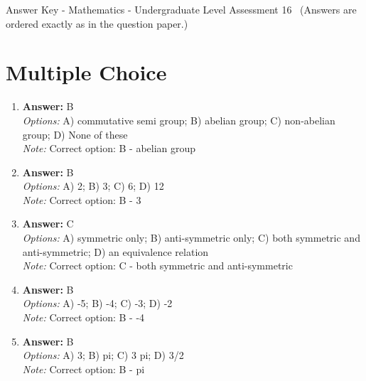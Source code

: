 \documentclass[12pt]{article}
\begin{document}
\begin{center}
Answer Key - Mathematics - Undergraduate Level Assessment 16 \
\small (Answers are ordered exactly as in the question paper.)
\end{center}

\section*{Multiple Choice}
\begin{enumerate}[label=\arabic*.]
\item \textbf{Answer:} B
\\ \textit{Options:} A) commutative semi group; B) abelian group; C) non-abelian group; D) None of these
\\ \textit{Note:} Correct option: B - abelian group
\item \textbf{Answer:} B
\\ \textit{Options:} A) 2; B) 3; C) 6; D) 12
\\ \textit{Note:} Correct option: B - 3
\item \textbf{Answer:} C
\\ \textit{Options:} A) symmetric only; B) anti-symmetric only; C) both symmetric and anti-symmetric; D) an equivalence relation
\\ \textit{Note:} Correct option: C - both symmetric and anti-symmetric
\item \textbf{Answer:} B
\\ \textit{Options:} A) -5; B) -4; C) -3; D) -2
\\ \textit{Note:} Correct option: B - -4
\item \textbf{Answer:} B
\\ \textit{Options:} A) 3; B) pi; C) 3 pi; D) 3/2
\\ \textit{Note:} Correct option: B - pi
\end{enumerate}
\end{document}
